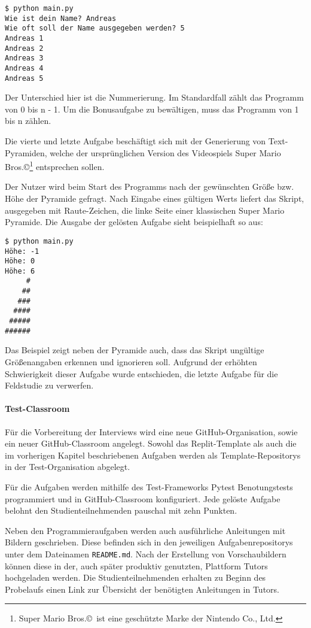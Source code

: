 \begin{lstlisting}[style=Bash]
$ python main.py
Wie ist dein Name? Andreas
Wie oft soll der Name ausgegeben werden? 5
Andreas 1
Andreas 2
Andreas 3
Andreas 4
Andreas 5
\end{lstlisting}

Der Unterschied hier ist die Nummerierung. Im Standardfall zählt das Programm
von 0 bis n - 1. Um die Bonusaufgabe zu bewältigen, muss das Programm von 1 bis
n zählen.

Die vierte und letzte Aufgabe beschäftigt sich mit der Generierung von
Text-Pyramiden, welche der ursprünglichen Version des Videospiels Super Mario
Bros.\copyright\footnote{Super Mario Bros.\copyright\ ist eine geschützte Marke
der Nintendo Co., Ltd.} entsprechen sollen. \parencite{git-repo:mario-less}

Der Nutzer wird beim Start des Programms nach der gewünschten Größe bzw. Höhe
der Pyramide gefragt. Nach Eingabe eines gültigen Werts liefert das Skript,
ausgegeben mit Raute-Zeichen, die linke Seite einer klassischen Super Mario
Pyramide. Die Ausgabe der gelösten Aufgabe sieht beispielhaft so aus:

\begin{lstlisting}[style=Bash]
$ python main.py
Höhe: -1
Höhe: 0
Höhe: 6
     #
    ##
   ###
  ####
 #####
######
\end{lstlisting}

\newpage

Das Beispiel zeigt neben der Pyramide auch, dass das Skript ungültige
Größenangaben erkennen und ignorieren soll. Aufgrund der erhöhten Schwierigkeit
dieser Aufgabe wurde entschieden, die letzte Aufgabe für die Feldstudie zu
verwerfen.

\paragraph{Test-Classroom}
Für die Vorbereitung der Interviews wird eine neue GitHub-Organisation, sowie
ein neuer GitHub-Classroom angelegt. Sowohl das Replit-Template als auch die im
vorherigen Kapitel beschriebenen Aufgaben werden als Template-Repositorys in
der Test-Organisation abgelegt. \parencite{git-orga:ndhbr-classroom}

Für die Aufgaben werden mithilfe des Test-Frameworks Pytest Benotungstests
programmiert und in GitHub-Classroom konfiguriert. Jede gelöste Aufgabe belohnt
den Studienteilnehmenden pauschal mit zehn Punkten.

Neben den Programmieraufgaben werden auch ausführliche Anleitungen mit Bildern
geschrieben. Diese befinden sich in den jeweiligen Aufgabenrepositorys unter dem
Dateinamen \texttt{README.md}. Nach der Erstellung von Vorschaubildern können
diese in der, auch später produktiv genutzten, Plattform Tutors hochgeladen
werden. Die Studienteilnehmenden erhalten zu Beginn des Probelaufs einen Link
zur Übersicht der benötigten Anleitungen in Tutors.

